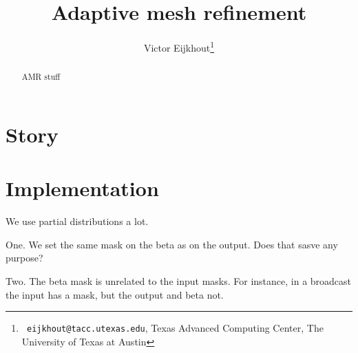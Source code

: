 \documentclass[11pt,fleqn,preprint]{impreport}
\title{Adaptive mesh refinement}
\author[Eijkhout]{Victor Eijkhout\thanks{{\tt
      eijkhout@tacc.utexas.edu}, Texas Advanced Computing Center, The
    University of Texas at Austin}}
\begin{document}
\maketitle

\begin{abstract}
  AMR stuff
\end{abstract}

\acresetall

\section{Story}

\section{Implementation}

We use partial distributions a lot.

One. We set the same mask on the beta as on the output. Does that
sasve any purpose?
%

Two. The beta mask is unrelated to the input masks. For instance,
in a broadcast the input has a mask, but the output and beta not.



\end{document}
